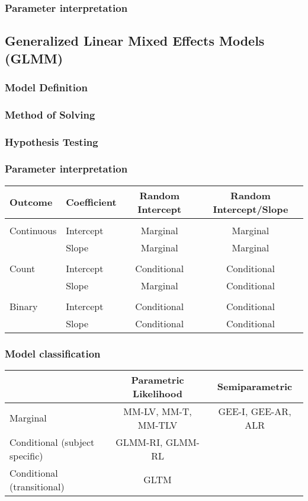 \documentclass[]{article}
\begin{document}
	\subsubsection{Parameter interpretation}

	\subsection{Generalized Linear Mixed Effects Models (GLMM)}
	\subsubsection{Model Definition}
	\subsubsection{Method of Solving}
	\subsubsection{Hypothesis Testing}
	\subsubsection{Parameter interpretation}
		\begin{tabular}{ | l | l | c | c | }
 \hline
		  Outcome & Coefficient & Random Intercept & Random Intercept/Slope \\
		  \hline
		    &   &   &   \\
		  Continuous & Intercept & Marginal & Marginal \\
		    & Slope & Marginal & Marginal \\
		    &   &   &   \\
		  Count & Intercept & Conditional & Conditional \\
		    & Slope & Marginal & Conditional \\
		    &   &   &   \\
		  Binary & Intercept & Conditional & Conditional \\
		    & Slope & Conditional & Conditional \\
				\hline
		\end{tabular}

	\subsubsection{Model classification}

	\begin{tabular}{|l|| c | c |}
	  \hline
	  \hline
	  ~ & Parametric Likelihood & Semiparametric\\
	  \hline
	  \hline
	  Marginal & MM-LV, MM-T, MM-TLV & GEE-I, GEE-AR, ALR  \\
	  \hline
	  Conditional (subject specific) & GLMM-RI, GLMM-RL &   \\
	  \hline
	  Conditional (transitional) & GLTM & \\
	  \hline
	\end{tabular}
\end{document}
